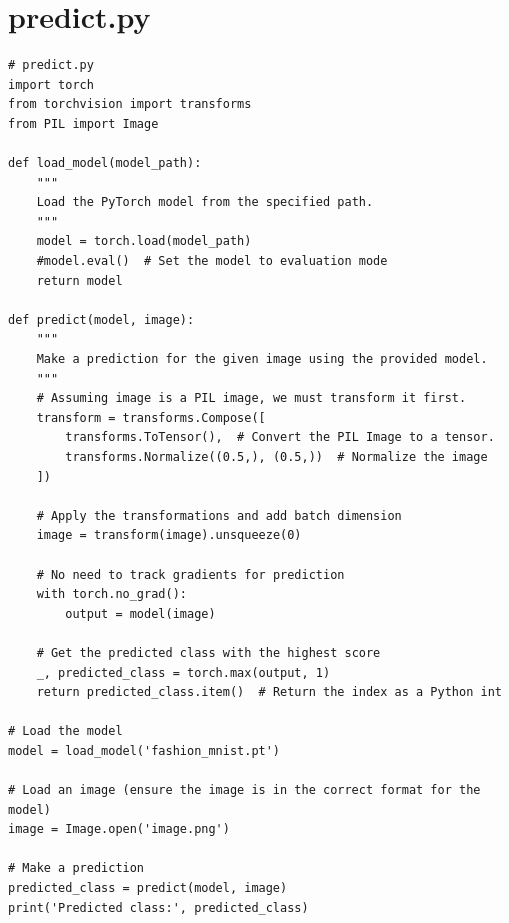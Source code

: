 \documentclass[12pt]{article}
\begin{document}
\section{predict.py}

\begin{lstlisting}
# predict.py
import torch
from torchvision import transforms
from PIL import Image

def load_model(model_path):
    """
    Load the PyTorch model from the specified path.
    """
    model = torch.load(model_path)
    #model.eval()  # Set the model to evaluation mode
    return model

def predict(model, image):
    """
    Make a prediction for the given image using the provided model.
    """
    # Assuming image is a PIL image, we must transform it first.
    transform = transforms.Compose([
        transforms.ToTensor(),  # Convert the PIL Image to a tensor.
        transforms.Normalize((0.5,), (0.5,))  # Normalize the image
    ])
    
    # Apply the transformations and add batch dimension
    image = transform(image).unsqueeze(0)
    
    # No need to track gradients for prediction
    with torch.no_grad():
        output = model(image)
    
    # Get the predicted class with the highest score
    _, predicted_class = torch.max(output, 1)
    return predicted_class.item()  # Return the index as a Python int

# Load the model
model = load_model('fashion_mnist.pt')

# Load an image (ensure the image is in the correct format for the model)
image = Image.open('image.png')

# Make a prediction
predicted_class = predict(model, image)
print('Predicted class:', predicted_class)

\end{lstlisting}
\end{document}
